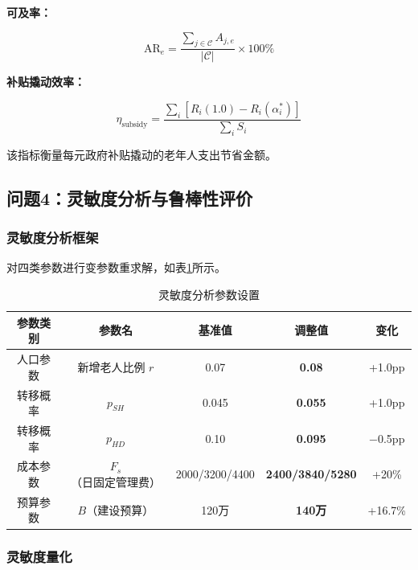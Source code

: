 \documentclass[UTF8]{ctexart}
\begin{document}
\textbf{可及率：}

\begin{equation}
\text{AR}_e = \frac{\sum_{j\in\mathcal{C}} A_{j,e}}{|\mathcal{C}|} \times 100\% \tag{3.13}
\end{equation}

\textbf{补贴撬动效率：}

\begin{equation}
\eta_{\text{subsidy}} = \frac{\sum_i \left[R_i(1.0) - R_i(\alpha_i^*)\right]}{\sum_i S_i} \tag{3.14}
\end{equation}

该指标衡量每元政府补贴撬动的老年人支出节省金额。


\subsection{问题4：灵敏度分析与鲁棒性评价}

\subsubsection{灵敏度分析框架}

对四类参数进行变参数重求解，如表\ref{tab:sensitivity_params}所示。

\begin{table}[H]
\centering
\caption{灵敏度分析参数设置}
\label{tab:sensitivity_params}
\renewcommand{\arraystretch}{1.3}
\begin{tabular}{|c|c|c|c|c|}
\hline
\textbf{参数类别} & \textbf{参数名} & \textbf{基准值} & \textbf{调整值} & \textbf{变化} \\
\hline
人口参数 & 新增老人比例 $r$ & 0.07 & \textbf{0.08} & +1.0pp \\
\hline
转移概率 & $p_{SH}$ & 0.045 & \textbf{0.055} & +1.0pp \\
\hline
转移概率 & $p_{HD}$ & 0.10 & \textbf{0.095} & −0.5pp \\
\hline
成本参数 & $F_s$（日固定管理费） & 2000/3200/4400 & \textbf{2400/3840/5280} & +20\% \\
\hline
预算参数 & $B$（建设预算） & 120万 & \textbf{140万} & +16.7\% \\
\hline
\end{tabular}
\end{table}

\subsubsection{灵敏度量化}
\end{document}

